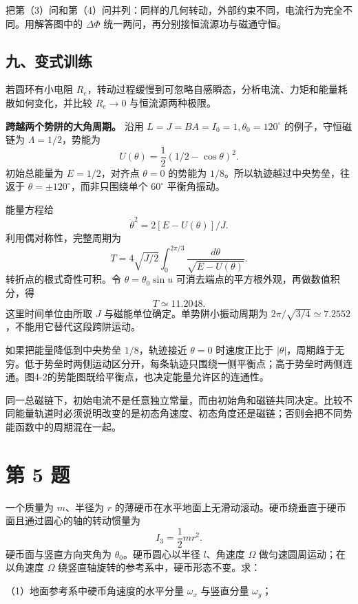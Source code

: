 \documentclass[12pt,a4paper,UTF8]{ctexart}
\begin{document}
把第（3）问和第（4）问并列：同样的几何转动，外部约束不同，电流行为完全不同。用解答图中的
\(\Delta\Phi\) 统一两问，再分别接恒流源功与磁通守恒。

\subsection{九、变式训练}\label{ux4e5dux53d8ux5f0fux8badux7ec3-3}

若圆环有小电阻
\(R_e\)，转动过程缓慢到可忽略自感瞬态，分析电流、力矩和能量耗散如何变化，并比较
\(R_e\to0\) 与恒流源两种极限。

\textbf{跨越两个势阱的大角周期。} 沿用
\(L=J=BA=I_0=1,\theta_0=120^\circ\) 的例子，守恒磁链为
\(\Lambda=1/2\)，势能为 \[
U(\theta)=\frac12(1/2-\cos\theta)^2.
\] 初始总能量为 \(E=1/2\)，对齐点 \(\theta=0\) 的势能为
\(1/8\)。所以轨迹越过中央势垒，往返于
\(\theta=\pm120^\circ\)，而非只围绕单个 \(60^\circ\) 平衡角振动。

能量方程给 \[
\dot\theta^2=2[E-U(\theta)]/J.
\] 利用偶对称性，完整周期为 \[
T=4\sqrt{J/2}\int_0^{2\pi/3}
\frac{d\theta}{\sqrt{E-U(\theta)}}.
\] 转折点的根式奇性可积。令 \(\theta=\theta_0\sin u\)
可消去端点的平方根外观，再做数值积分，得 \[
T\simeq11.2048.
\] 这里时间单位由所取 \(J\) 与磁能单位确定。单势阱小振动周期为
\(2\pi/\sqrt{3/4}\simeq7.2552\)，不能用它替代这段跨阱运动。

如果把能量降低到中央势垒 \(1/8\)，轨迹接近 \(\theta=0\) 时速度正比于
\(|\theta|\)，周期趋于无穷。低于势垒时两侧运动区分开，每条轨迹只围绕一侧平衡点；高于势垒时两侧连通。图4-2的势能图既给平衡点，也决定能量允许区的连通性。

同一总磁链下，初始电流不是任意独立常量，而由初始角和磁链共同决定。比较不同能量轨道时必须说明改变的是初态角速度、初态角度还是磁链；否则会把不同势能函数中的周期混在一起。

\newpage

\section{第 5 题}\label{ux7b2c-5-ux9898}

一个质量为 \(m\)、半径为 \(r\)
的薄硬币在水平地面上无滑动滚动。硬币绕垂直于硬币面且通过圆心的轴的转动惯量为
\[
I_3=\frac12mr^2.
\] 硬币面与竖直方向夹角为 \(\theta_0\)。硬币圆心以半径 \(l\)、角速度
\(\Omega\) 做匀速圆周运动；在以角速度 \(\Omega\)
绕竖直轴旋转的参考系中，硬币形态不变。求：

（1）地面参考系中硬币角速度的水平分量 \(\omega_x\) 与竖直分量
\(\omega_y\)；
\end{document}

